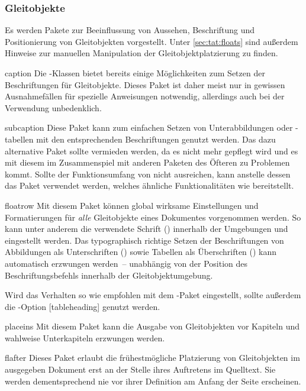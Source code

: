 \documentclass[%
  english,ngerman,%
  headings=optiontoheadandtoc,captions=tableheading,numbers=noenddot,%
  chapterpage,cdfoot,%
]{tudscrman}
\begin{document}
\subsubsection{Gleitobjekte}
Es werden Pakete zur Beeinflussung von Aussehen, Beschriftung und Positionierung 
von Gleitobjekten vorgestellt. Unter \autoref{sec:tat:floats} sind außerdem 
Hinweise zur manuellen Manipulation der Gleitobjektplatzierung zu finden.
\begin{packages}
\item[caption]
  Die \KOMAScript-Klassen bietet bereits einige Möglichkeiten zum Setzen der  
  Beschriftungen für Gleitobjekte. Dieses Paket ist daher meist nur in gewissen
  Ausnahmefällen für spezielle Anweisungen notwendig, allerdings auch bei der  
  Verwendung unbedenklich.
\item[subcaption]
  Diese Paket kann zum einfachen Setzen von Unterabbildungen oder -tabellen mit 
  den entsprechenden Beschriftungen genutzt werden. Das dazu alternative Paket 
   sollte vermieden werden, da es nicht mehr gepflegt wird und 
  es mit diesem im Zusammenspiel mit anderen Paketen des Öfteren zu Problemen 
  kommt. Sollte der Funktionsumfang von  nicht ausreichen, 
  kann anstelle dessen das Paket  verwendet werden, welches 
  ähnliche Funktionalitäten wie  bereitstellt.
\item[floatrow]
  Mit diesem Paket können global wirksame Einstellungen und Formatierungen für 
  \emph{alle} Gleitobjekte eines Dokumentes vorgenommen werden. So kann unter 
  anderem die verwendete Schrift () 
  innerhalb der Umgebungen  und  
  eingestellt werden. Das typographisch richtige Setzen der Beschriftungen von 
  Abbildungen als Unterschriften 
  ()
  sowie Tabellen als Überschriften 
  ()
  kann automatisch erzwungen werden~-- unabhängig von der Position des 
  Beschriftungsbefehls  innerhalb der Gleitobjektumgebung.
  
  Wird das Verhalten so wie empfohlen mit dem -Paket 
  eingestellt, sollte außerdem die \KOMAScript-Option 
  [tableheading] genutzt werden.
\item[placeins]
  Mit diesem Paket kann die Ausgabe von Gleitobjekten vor Kapiteln und wahlweise
  Unterkapiteln erzwungen werden.
\item[flafter]
  Dieses Paket erlaubt die frühestmögliche Platzierung von Gleitobjekten im 
  ausgegeben Dokument erst an der Stelle ihres Auftretens im Quelltext. Sie 
  werden dementsprechend nie vor ihrer Definition am Anfang der Seite erscheinen.
\end{packages}
\end{document}
